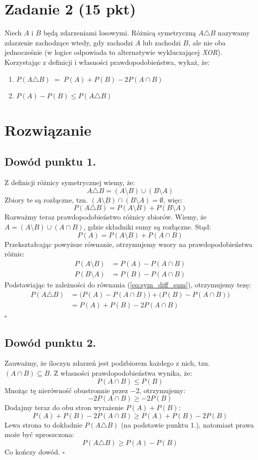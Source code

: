 \documentclass[polish, 10pt]{extarticle}
\begin{document}
\section*{Zadanie 2 (15 pkt)}
Niech \(A\) i \(B\) będą zdarzeniami losowymi.
Różnicą symetryczną \(A \triangle B\) nazywamy zdarzenie zachodzące wtedy, gdy zachodzi \(A\) lub zachodzi \(B\), ale nie oba jednocześnie (w logice odpowiada to alternatywie wykluczającej \emph{XOR}). Korzystając z definicji i własności prawdopodobieństwa, wykaż, że:
\begin{enumerate}
\item $P(A \triangle B) \;=\; P(A) + P(B) - 2P(A \cap B)$
\item $P(A) - P(B) \leq P(A \triangle B)$
\end{enumerate}
\section*{Rozwiązanie}

\subsection*{Dowód punktu 1.}
Z definicji różnicy symetrycznej wiemy, że:
\[ A \triangle B = (A \setminus B) \cup (B \setminus A) \]
Zbiory te są rozłączne, tzn. $(A \setminus B) \cap (B \setminus A) = \emptyset$, więc:
\begin{equation}
    P(A \triangle B) = P(A \setminus B) + P(B \setminus A) \label{eq:sym_diff_sum}
\end{equation}
Rozważmy teraz prawdopodobieństwo różnicy zbiorów. Wiemy, że $A = (A \setminus B) \cup (A \cap B)$, gdzie składniki sumy są rozłączne. Stąd:
\[ P(A) = P(A \setminus B) + P(A \cap B) \]
Przekształcając powyższe równanie, otrzymujemy wzory na prawdopodobieństwa różnic:
\begin{align*}
    P(A \setminus B) &= P(A) - P(A \cap B) \\
    P(B \setminus A) &= P(B) - P(A \cap B)
\end{align*}
Podstawiając te zależności do równania (\ref{eq:sym_diff_sum}), otrzymujemy tezę:
\begin{align*}
    P(A \triangle B) &= \bigl( P(A) - P(A \cap B) \bigr) + \bigl( P(B) - P(A \cap B) \bigr) \\
    &= P(A) + P(B) - 2P(A \cap B)
\end{align*}
\hfill $\square$

\subsection*{Dowód punktu 2.}
Zauważmy, że iloczyn zdarzeń jest podzbiorem każdego z nich, tzn. $(A \cap B) \subseteq B$. Z własności prawdopodobieństwa wynika, że:
\[ P(A \cap B) \leq P(B) \]
Mnożąc tę nierówność obustronnie przez $-2$, otrzymujemy:
\[ -2P(A \cap B) \geq -2P(B) \]
Dodajmy teraz do obu stron wyrażenie $P(A) + P(B)$:
\[ P(A) + P(B) - 2P(A \cap B) \geq P(A) + P(B) - 2P(B) \]
Lewa strona to dokładnie $P(A \triangle B)$ (na podstawie punktu 1.), natomiast prawa może być uproszczona:
\[ P(A \triangle B) \geq P(A) - P(B) \]
Co kończy dowód.
\hfill $\square$
\end{document}
